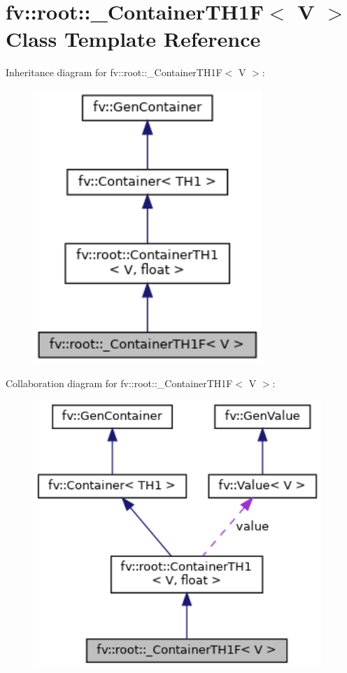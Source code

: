 \hypertarget{classfv_1_1root_1_1__ContainerTH1F}{}\section{fv\+:\+:root\+:\+:\+\_\+\+Container\+T\+H1F$<$ V $>$ Class Template Reference}
\label{classfv_1_1root_1_1__ContainerTH1F}


Inheritance diagram for fv\+:\+:root\+:\+:\+\_\+\+Container\+T\+H1F$<$ V $>$\+:
\nopagebreak
\begin{figure}[H]
\begin{center}
\leavevmode
\includegraphics[width=244pt]{classfv_1_1root_1_1__ContainerTH1F__inherit__graph}
\end{center}
\end{figure}


Collaboration diagram for fv\+:\+:root\+:\+:\+\_\+\+Container\+T\+H1F$<$ V $>$\+:
\nopagebreak
\begin{figure}[H]
\begin{center}
\leavevmode
\includegraphics[width=308pt]{classfv_1_1root_1_1__ContainerTH1F__coll__graph}
\end{center}
\end{figure}
